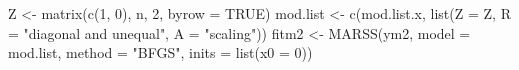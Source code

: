 \begin{Schunk}
\begin{Sinput}
 Z <- matrix(c(1, 0), n, 2, byrow = TRUE)
 mod.list <- c(mod.list.x, list(Z = Z, R = "diagonal and unequal", A = "scaling"))
 fitm2 <- MARSS(ym2, model = mod.list, method = "BFGS", inits = list(x0 = 0))
\end{Sinput}
\end{Schunk}

